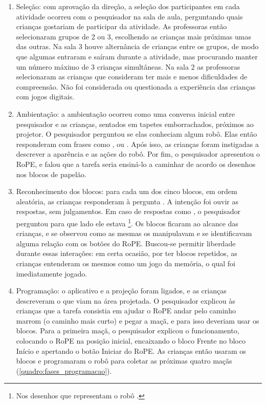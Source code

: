 \begin{enumerate}
    \item Seleção: com aprovação da direção, a seleção dos participantes em cada atividade ocorreu com o pesquisador na sala de aula, perguntando quais crianças gostariam de participar da atividade. As professoras então selecionaram grupos de 2 ou 3, escolhendo as crianças mais próximas umas das outras. Na sala 3 houve alternância de crianças entre os grupos, de modo que algumas entraram e saíram durante a atividade, mas procurando manter um número máximo de 3 crianças simultâneas. Na sala 2 as professoras selecionaram as crianças que consideram ter mais e menos dificuldades de compreensão. Não foi considerada ou questionada a experiência das crianças com jogos digitais. 
    
    \item Ambientação: a ambientação ocorreu como uma conversa inicial entre pesquisador e as crianças, sentados em tapetes emborrachados, próximos ao projetor. O pesquisador perguntou se elas conheciam algum robô. Elas então responderam com frases como , ou . Após isso, as crianças foram instigadas a descrever a aparência e as ações do robô. Por fim, o pesquisador apresentou o RoPE, e falou que a tarefa seria ensiná-lo a caminhar de acordo os desenhos nos blocos de papelão.
    
    \item Reconhecimento dos blocos: para cada um dos cinco blocos, em ordem aleatória, as crianças responderam à pergunta . A intenção foi ouvir as respostas, sem julgamentos. Em caso de respostas como , o pesquisador perguntou para que lado ele estava \footnote{Nos desenhos que representam o robô .}. Os blocos ficaram ao alcance das crianças, e se observou como as mesmas os manipulavam e se identificavam alguma relação com os botões do RoPE. Buscou-se permitir liberdade durante essas interações: em certa ocasião, por ter blocos repetidos, as crianças entenderam os mesmos como um jogo da memória, o qual foi imediatamente jogado.
    
    \item Programação: o aplicativo e a projeção foram ligados, e as crianças descreveram o que viam na área projetada. O pesquisador explicou às crianças que a tarefa consistia em ajudar o RoPE andar pelo caminho marrom (o caminho mais curto) e pegar a maçã, e para isso deveriam usar os blocos. Para a primeira maçã, o pesquisador explicou o funcionamento, colocando o RoPE na posição inicial, encaixando o bloco Frente no bloco Início e apertando o botão Iniciar do RoPE. As crianças então usaram os blocos e programaram o robô para coletar as próximas quatro maçãs (\autoref{quadro:fases_programacao}).
    

\end{enumerate}
